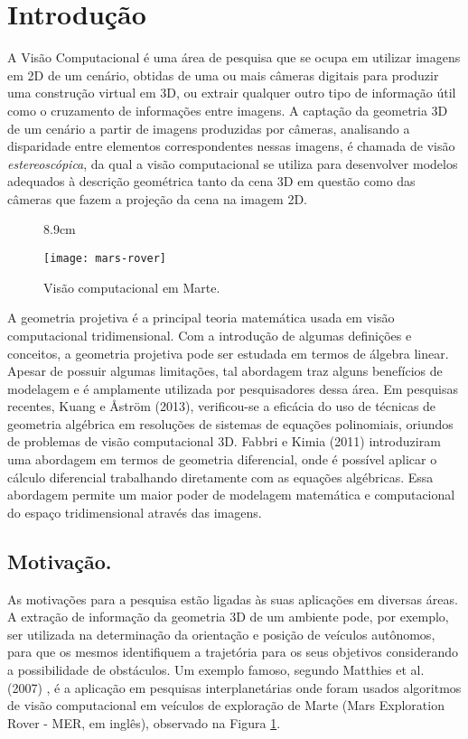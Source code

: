 \chapter*{Introdução}

A Visão Computacional é uma área de pesquisa que se ocupa em utilizar imagens em 2D de um cenário, obtidas de uma ou mais câmeras digitais para produzir uma construção virtual em 3D, ou extrair qualquer outro tipo de informação útil como o cruzamento de informações entre imagens. A captação da geometria 3D de um cenário a partir de imagens produzidas por câmeras, analisando a disparidade entre elementos correspondentes nessas imagens, é chamada de visão {\it estereoscópica}, da qual a visão computacional se utiliza para desenvolver modelos adequados à descrição geométrica tanto da cena 3D em questão como das câmeras que fazem a projeção da cena na imagem 2D.

\begin{figure}[!htb]{8.9cm}
  \caption{Visão computacional em Marte.} \label{fig.mars-rover}
  \texttt{[image: mars-rover]}
\end{figure}

A geometria projetiva é a principal teoria matemática usada em visão computacional tridimensional. Com a introdução de algumas definições e conceitos, a geometria projetiva pode ser estudada em termos de álgebra linear. Apesar de possuir algumas limitações, tal abordagem traz alguns benefícios de modelagem e é amplamente utilizada por pesquisadores dessa área. Em pesquisas recentes, Kuang e \AA str\"om (2013), verificou-se a eficácia do uso de técnicas de geometria algébrica em resoluções de sistemas de equações polinomiais, oriundos de problemas de visão computacional 3D. Fabbri e Kimia (2011) introduziram uma abordagem em termos de geometria diferencial, onde é possível aplicar o cálculo diferencial trabalhando diretamente com as equações algébricas. Essa abordagem permite um maior poder de modelagem matemática e computacional do espaço tridimensional através das imagens.

\section*{Motivação.}
As motivações para a pesquisa estão ligadas às suas aplicações em diversas áreas. A extração de informação da geometria 3D de um ambiente pode, por exemplo, ser utilizada na determinação da orientação e posição de veículos autônomos, para que os mesmos identifiquem a trajetória para os seus objetivos considerando a possibilidade de obstáculos. Um exemplo famoso, segundo Matthies et al. (2007) , é a aplicação em pesquisas interplanetárias onde foram usados algoritmos de visão computacional em veículos de exploração de Marte (Mars Exploration Rover - MER, em inglês), observado na Figura \ref{fig.mars-rover}.


